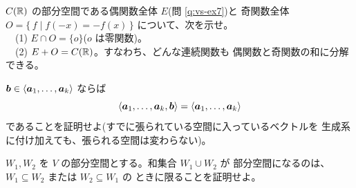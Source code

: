 \begin{mondai}[発展]\label{q:sub-ex10}
$C(\mathbb{R})$ の部分空間である偶関数全体 $E$(問 \ref{q:vs-ex7})と
奇関数全体 $O = \{\, f \mid f(-x) = -f(x) \,\}$ について、次を示せ。\\
　(1) $E \cap O = \{o\}$($o$ は零関数)。\\
　(2) $E + O = C(\mathbb{R})$。すなわち、どんな連続関数も
偶関数と奇関数の和に分解できる。
\end{mondai}

\begin{mondai}[証明]\label{q:sub-ex11}
$\bm{b} \in \langle \bm{a}_1, \dots, \bm{a}_k \rangle$ ならば
\[
\langle \bm{a}_1, \dots, \bm{a}_k, \bm{b} \rangle
= \langle \bm{a}_1, \dots, \bm{a}_k \rangle
\]
であることを証明せよ(すでに張られている空間に入っているベクトルを
生成系に付け加えても、張られる空間は変わらない)。
\end{mondai}

\begin{mondai}[証明]\label{q:sub-ex12}
$W_1, W_2$ を $V$ の部分空間とする。和集合 $W_1 \cup W_2$ が
部分空間になるのは、$W_1 \subseteq W_2$ または $W_2 \subseteq W_1$ の
ときに限ることを証明せよ。
\end{mondai}

